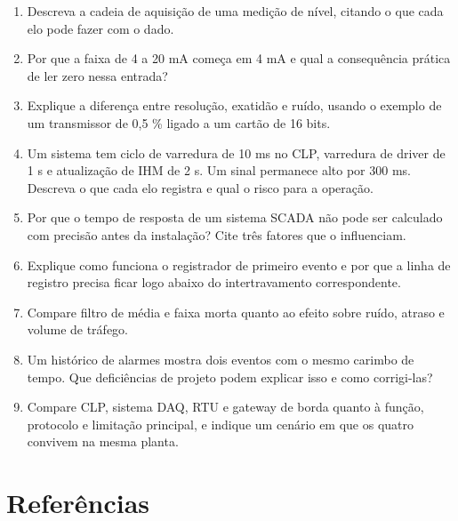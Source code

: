 \begin{enumerate}
\def\labelenumi{\arabic{enumi}.}
\tightlist
\item
  Descreva a cadeia de aquisição de uma medição de nível, citando o que cada elo pode fazer com o dado.
\item
  Por que a faixa de 4 a 20 mA começa em 4 mA e qual a consequência prática de ler zero nessa entrada?
\item
  Explique a diferença entre resolução, exatidão e ruído, usando o exemplo de um transmissor de 0,5 \% ligado a um cartão de 16 bits.
\item
  Um sistema tem ciclo de varredura de 10 ms no CLP, varredura de driver de 1 s e atualização de IHM de 2 s. Um sinal permanece alto por 300 ms. Descreva o que cada elo registra e qual o risco para a operação.
\item
  Por que o tempo de resposta de um sistema SCADA não pode ser calculado com precisão antes da instalação? Cite três fatores que o influenciam.
\item
  Explique como funciona o registrador de primeiro evento e por que a linha de registro precisa ficar logo abaixo do intertravamento correspondente.
\item
  Compare filtro de média e faixa morta quanto ao efeito sobre ruído, atraso e volume de tráfego.
\item
  Um histórico de alarmes mostra dois eventos com o mesmo carimbo de tempo. Que deficiências de projeto podem explicar isso e como corrigi-las?
\item
  Compare CLP, sistema DAQ, RTU e gateway de borda quanto à função, protocolo e limitação principal, e indique um cenário em que os quatro convivem na mesma planta.
\end{enumerate}

\section{Referências}\label{referuxeancias}

